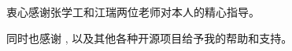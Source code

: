 ﻿%

\begin{ack}
	衷心感谢张学工和江瑞两位老师对本人的精心指导。 
	
	同时也感谢 \href{https://github.com/xueruini/thuthesis}{\thuthesis}, 
	以及其他各种开源项目给予我的帮助和支持。 
\end{ack}
